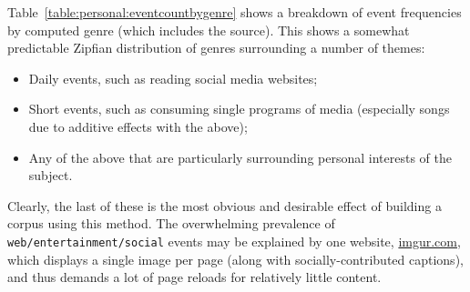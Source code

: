 Table~\ref{table:personal:eventcountbygenre} shows a breakdown of event frequencies by computed genre (which includes the source).  This shows a somewhat predictable Zipfian distribution of genres surrounding a number of themes:

\begin{itemize}
    \item Daily events, such as reading social media websites;
    \item Short events, such as consuming single programs of media (especially songs due to additive effects with the above);
    \item Any of the above that are particularly surrounding personal interests of the subject.
\end{itemize}

Clearly, the last of these is the most obvious and desirable effect of building a corpus using this method.  The overwhelming prevalence of \texttt{web/entertainment/social} events may be explained by one website, \url{imgur.com}, which displays a single image per page (along with socially-contributed captions), and thus demands a lot of page reloads for relatively little content.


